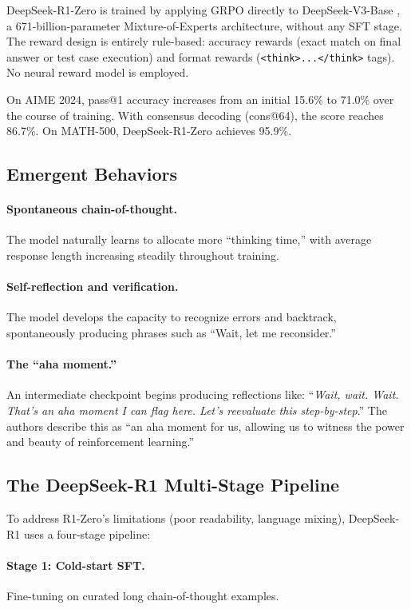 \documentclass[12pt,a4paper]{report}
\theoremstyle{definition}
\begin{document}
DeepSeek-R1-Zero is trained by applying GRPO directly to DeepSeek-V3-Base \cite{deepseek2024v3}, a 671-billion-parameter Mixture-of-Experts architecture, without any SFT stage. The reward design is entirely rule-based: accuracy rewards (exact match on final answer or test case execution) and format rewards (\texttt{<think>...</think>} tags). No neural reward model is employed.

On AIME 2024, pass@1 accuracy increases from an initial 15.6\% to 71.0\% over the course of training. With consensus decoding (cons@64), the score reaches 86.7\%. On MATH-500, DeepSeek-R1-Zero achieves 95.9\%.

\subsection{Emergent Behaviors}

\paragraph{Spontaneous chain-of-thought.} The model naturally learns to allocate more ``thinking time,'' with average response length increasing steadily throughout training.

\paragraph{Self-reflection and verification.} The model develops the capacity to recognize errors and backtrack, spontaneously producing phrases such as ``Wait, let me reconsider.''

\paragraph{The ``aha moment.''} An intermediate checkpoint begins producing reflections like: ``\textit{Wait, wait. Wait. That's an aha moment I can flag here. Let's reevaluate this step-by-step}.'' The authors describe this as ``an aha moment for us, allowing us to witness the power and beauty of reinforcement learning.''

\subsection{The DeepSeek-R1 Multi-Stage Pipeline}

To address R1-Zero's limitations (poor readability, language mixing), DeepSeek-R1 uses a four-stage pipeline:

\paragraph{Stage 1: Cold-start SFT.} Fine-tuning on curated long chain-of-thought examples.
\end{document}
